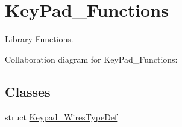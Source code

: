 \hypertarget{group___key_pad___functions}{}\section{Key\+Pad\+\_\+\+Functions}
\label{group___key_pad___functions}


Library Functions.  


Collaboration diagram for Key\+Pad\+\_\+\+Functions\+:
\subsection*{Classes}
\begin{DoxyCompactItemize}
\item 
struct \hyperlink{struct_keypad___wires_type_def}{Keypad\+\_\+\+Wires\+Type\+Def}
\end{DoxyCompactItemize}
